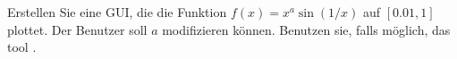 \begin{aufg}[0]
Erstellen Sie eine GUI, die die Funktion $f(x) = x^a \sin(1/x)$ auf
  $[0.01, 1]$ plottet. Der Benutzer soll $a$ modifizieren k\"onnen. Benutzen sie, falls möglich, 
das tool .
\end{aufg}